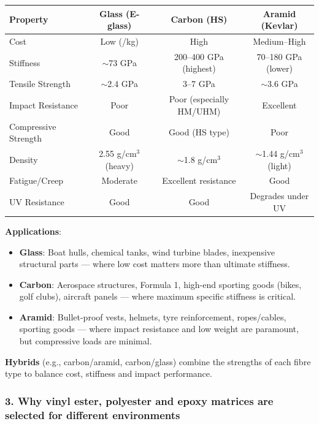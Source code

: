 \documentclass{NoteThesis/note-thesis}
\begin{document}
\begin{table}[h]
    \centering
    \begin{tabular}{lccc}
        \hline
        Property & \textbf{Glass (E-glass)} & \textbf{Carbon (HS)} & \textbf{Aramid (Kevlar)} \\
        \hline
        Cost & Low (\texteuro1.3/kg) & High & Medium--High \\
        Stiffness & $\sim$73 GPa & 200--400 GPa (highest) & 70--180 GPa (lower) \\
        Tensile Strength & $\sim$2.4 GPa & 3--7 GPa & $\sim$3.6 GPa \\
        Impact Resistance & Poor & Poor (especially HM/UHM) & Excellent \\
        Compressive Strength & Good & Good (HS type) & Poor \\
        Density & 2.55 g/cm$^3$ (heavy) & $\sim$1.8 g/cm$^3$ & $\sim$1.44 g/cm$^3$ (light) \\
        Fatigue/Creep & Moderate & Excellent resistance & Good \\
        UV Resistance & Good & Good & Degrades under UV \\
        \hline
    \end{tabular}
\end{table}

\textbf{Applications}:
\begin{itemize}
    \item \textbf{Glass}: Boat hulls, chemical tanks, wind turbine blades, inexpensive structural parts — where low cost matters more than ultimate stiffness.
    \item \textbf{Carbon}: Aerospace structures, Formula 1, high-end sporting goods (bikes, golf clubs), aircraft panels — where maximum specific stiffness is critical.
    \item \textbf{Aramid}: Bullet-proof vests, helmets, tyre reinforcement, ropes/cables, sporting goods — where impact resistance and low weight are paramount, but compressive loads are minimal.
\end{itemize}

\textbf{Hybrids} (e.g., carbon/aramid, carbon/glass) combine the strengths of each fibre type to balance cost, stiffness and impact performance.

\subsubsection*{3. Why vinyl ester, polyester and epoxy matrices are selected for different environments}
\end{document}
